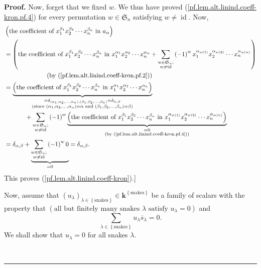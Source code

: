 \documentclass[numbers=enddot,12pt,final,onecolumn,notitlepage]{scrartcl}%
\theoremstyle{definition}
\newenvironment{proof}[1][Proof]{\noindent\textbf{#1.} }{\ \rule{0.5em}{0.5em}}
\let\sumnonlimits\sum
\renewcommand{\sum}{\sumnonlimits\limits}
\newenvironment{verlong}{}{}
\begin{document}
\begin{proof}
\begin{verlong}
Now, forget that we fixed $w$. We thus have proved
(\ref{pf.lem.alt.linind.coeff-kron.pf.4}) for every permutation $w\in
\mathfrak{S}_{n}$ satisfying $w\neq\operatorname*{id}$. Now,%
\begin{align*}
&  \left(  \text{the coefficient of }x_{1}^{\beta_{1}}x_{2}^{\beta_{2}}\cdots
x_{n}^{\beta_{n}}\text{ in }a_{\alpha}\right) \\
&  =\left(  \text{the coefficient of }x_{1}^{\beta_{1}}x_{2}^{\beta_{2}}\cdots
x_{n}^{\beta_{n}}\text{ in }x_{1}^{\alpha_{1}}x_{2}^{\alpha_{2}}\cdots
x_{n}^{\alpha_{n}}+\sum_{\substack{w\in\mathfrak{S}_{n};\\w\neq
\operatorname*{id}}}\left(  -1\right)  ^{w}x_{1}^{\alpha_{w\left(  1\right)
}}x_{2}^{\alpha_{w\left(  2\right)  }}\cdots x_{n}^{\alpha_{w\left(  n\right)
}}\right) \\
&  \ \ \ \ \ \ \ \ \ \ \ \ \ \ \ \ \ \ \ \ \left(  \text{by
(\ref{pf.lem.alt.linind.coeff-kron.pf.2})}\right) \\
&  =\underbrace{\left(  \text{the coefficient of }x_{1}^{\beta_{1}}%
x_{2}^{\beta_{2}}\cdots x_{n}^{\beta_{n}}\text{ in }x_{1}^{\alpha_{1}}%
x_{2}^{\alpha_{2}}\cdots x_{n}^{\alpha_{n}}\right)  }_{\substack{=\delta
_{\left(  \alpha_{1},\alpha_{2},\ldots,\alpha_{n}\right)  ,\left(  \beta
_{1},\beta_{2},\ldots,\beta_{n}\right)  }=\delta_{\alpha,\beta}\\\text{(since
}\left(  \alpha_{1},\alpha_{2},\ldots,\alpha_{n}\right)  =\alpha\text{ and
}\left(  \beta_{1},\beta_{2},\ldots,\beta_{n}\right)  =\beta\text{)}}}\\
&  \ \ \ \ \ \ \ \ \ \ +\sum_{\substack{w\in\mathfrak{S}_{n};\\w\neq
\operatorname*{id}}}\left(  -1\right)  ^{w}\underbrace{\left(  \text{the
coefficient of }x_{1}^{\beta_{1}}x_{2}^{\beta_{2}}\cdots x_{n}^{\beta_{n}%
}\text{ in }x_{1}^{\alpha_{w\left(  1\right)  }}x_{2}^{\alpha_{w\left(
2\right)  }}\cdots x_{n}^{\alpha_{w\left(  n\right)  }}\right)  }%
_{\substack{=0\\\text{(by (\ref{pf.lem.alt.linind.coeff-kron.pf.4}))}}}\\
&  =\delta_{\alpha,\beta}+\underbrace{\sum_{\substack{w\in\mathfrak{S}%
_{n};\\w\neq\operatorname*{id}}}\left(  -1\right)  ^{w}0}_{=0}=\delta
_{\alpha,\beta}.
\end{align*}
This proves (\ref{pf.lem.alt.linind.coeff-kron}).]
\end{verlong}

Now, assume that $\left(  u_{\lambda}\right)  _{\lambda\in\left\{
\text{snakes}\right\}  }\in\mathbf{k}^{\left\{  \text{snakes}\right\}  }$ be a
family of scalars with the property that $\left(  \text{all but finitely many
snakes }\lambda\text{ satisfy }u_{\lambda}=0\right)  $ and
\begin{equation}
\sum_{\lambda\in\left\{  \text{snakes}\right\}  }u_{\lambda}\overline
{s}_{\lambda}=0. \label{pf.lem.alt.linind.ass}%
\end{equation}
We shall show that $u_{\lambda}=0$ for all snakes $\lambda$.


\end{proof}
\end{document}
